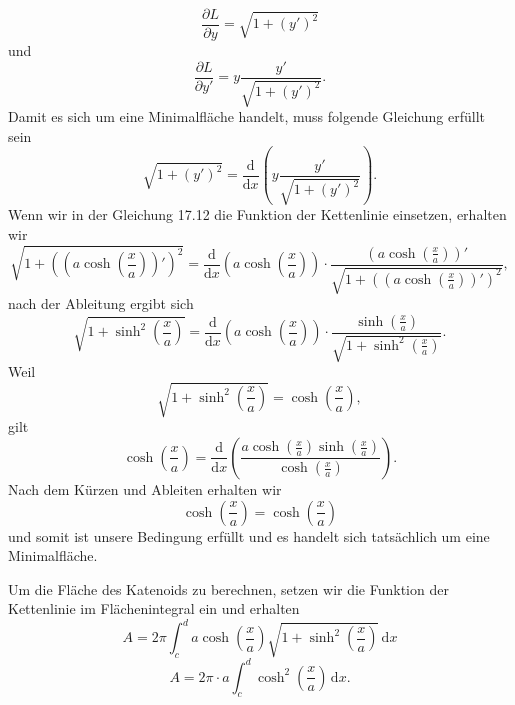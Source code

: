 \begin{equation}
	\frac{\partial L}{\partial y} = \sqrt{1 + (y')^2}
\end{equation}
und 
\begin{equation}
	\frac{\partial L}{\partial y'} = y \frac{y'}{\sqrt{1 + (y')^2}}.
\end{equation}
Damit es sich um eine Minimalfläche handelt, muss folgende Gleichung erfüllt sein 
\begin{equation}
	\sqrt{1 + (y')^2} = \frac{\mathrm{d}}{\mathrm{d}x} \left( y \frac{y'}{\sqrt{1 + (y')^2}} \right).
\end{equation}
Wenn wir in der Gleichung 17.12 die Funktion der Kettenlinie einsetzen, erhalten wir 
\begin{equation}
	\sqrt{1 + \left( \left( a \cosh \left( \frac{x}{a} \right) \right)' \right)^2 } = \frac{\mathrm{d}}{\mathrm{d}x} \left( a \cosh \left( \frac{x}{a} \right) \right) \cdot \frac{\left( a \cosh \left( \frac{x}{a} \right) \right)'}{\sqrt{1 + \left( \left( a \cosh \left( \frac{x}{a} \right) \right)' \right)^2 }},
\end{equation}
nach der Ableitung ergibt sich 
\begin{equation}
	\sqrt{1 + \sinh^2 \left( \frac{x}{a} \right)} = \frac{\mathrm{d}}{\mathrm{d}x} \left( a \cosh \left( \frac{x}{a} \right) \right) \cdot \frac{\sinh \left( \frac{x}{a} \right)}{\sqrt{1 + \sinh^2 \left( \frac{x}{a} \right)}}.
\end{equation}
Weil
\begin{equation}
	\sqrt{1 + \sinh^2 \left( \frac{x}{a} \right)} = \cosh \left( \frac{x}{a} \right),
\end{equation}
gilt 
\begin{equation}
	\cosh \left( \frac{x}{a} \right) = \frac{\mathrm{d}}{\mathrm{d}x} \left( \frac{a \cosh \left( \frac{x}{a} \right) \sinh \left( \frac{x}{a} \right)}{\cosh \left( \frac{x}{a} \right)} \right).
\end{equation}	
Nach dem Kürzen und Ableiten erhalten wir 
\begin{equation}
	\cosh \left( \frac{x}{a} \right) = \cosh \left( \frac{x}{a} \right)
\end{equation}	
und somit ist unsere Bedingung erfüllt und es handelt sich tatsächlich um eine Minimalfläche. 

Um die Fläche des Katenoids zu berechnen, setzen wir die Funktion der Kettenlinie im Flächenintegral ein und erhalten 
\begin{equation}
	A = 2\pi \int_{c}^{d} a \cosh \left( \frac{x}{a} \right) \sqrt{1 + \sinh^2 \left( \frac{x}{a} \right)} \, \mathrm{d}x
\end{equation}
\begin{equation}
	A = 2\pi \cdot a \int_{c}^{d} \cosh^2 \left( \frac{x}{a} \right) \, \mathrm{d}x.
\end{equation}
